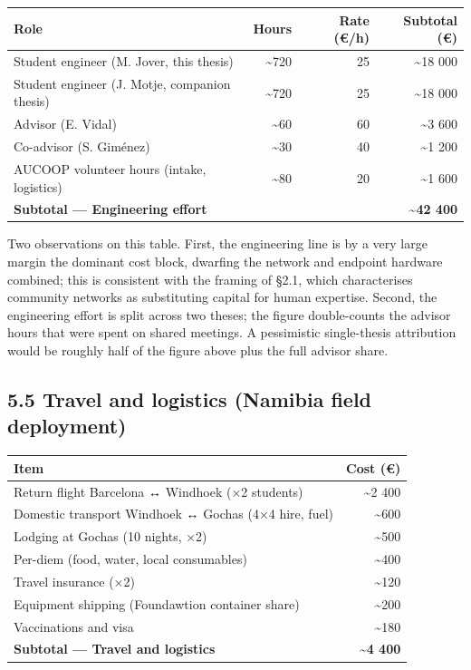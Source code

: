 \begin{longtable}[]{@{}lrrr@{}}
\toprule\noalign{}
Role & Hours & Rate (€/h) & Subtotal (€) \\
\midrule\noalign{}
\endhead
\bottomrule\noalign{}
\endlastfoot
Student engineer (M. Jover, this thesis) & \textasciitilde720 & 25 &
\textasciitilde18 000 \\
Student engineer (J. Motje, companion thesis) & \textasciitilde720 & 25
& \textasciitilde18 000 \\
Advisor (E. Vidal) & \textasciitilde60 & 60 & \textasciitilde3 600 \\
Co-advisor (S. Giménez) & \textasciitilde30 & 40 & \textasciitilde1
200 \\
AUCOOP volunteer hours (intake, logistics) & \textasciitilde80 & 20 &
\textasciitilde1 600 \\
\textbf{Subtotal --- Engineering effort} & & & \textbf{\textasciitilde42
400} \\
\end{longtable}

Two observations on this table. First, the engineering line is by a very
large margin the dominant cost block, dwarfing the network and endpoint
hardware combined; this is consistent with the framing of §2.1, which
characterises community networks as substituting capital for human
expertise. Second, the engineering effort is split across two theses;
the figure double-counts the advisor hours that were spent on shared
meetings. A pessimistic single-thesis attribution would be roughly half
of the figure above plus the full advisor share.

\hypertarget{travel-and-logistics-namibia-field-deployment}{%
\subsection{5.5 Travel and logistics (Namibia field
deployment)}\label{travel-and-logistics-namibia-field-deployment}}

\begin{longtable}[]{@{}lr@{}}
\toprule\noalign{}
Item & Cost (€) \\
\midrule\noalign{}
\endhead
\bottomrule\noalign{}
\endlastfoot
Return flight Barcelona ↔ Windhoek (×2 students) & \textasciitilde2
400 \\
Domestic transport Windhoek ↔ Gochas (4×4 hire, fuel) &
\textasciitilde600 \\
Lodging at Gochas (10 nights, ×2) & \textasciitilde500 \\
Per-diem (food, water, local consumables) & \textasciitilde400 \\
Travel insurance (×2) & \textasciitilde120 \\
Equipment shipping (Foundawtion container share) & \textasciitilde200 \\
Vaccinations and visa & \textasciitilde180 \\
\textbf{Subtotal --- Travel and logistics} & \textbf{\textasciitilde4
400} \\
\end{longtable}

